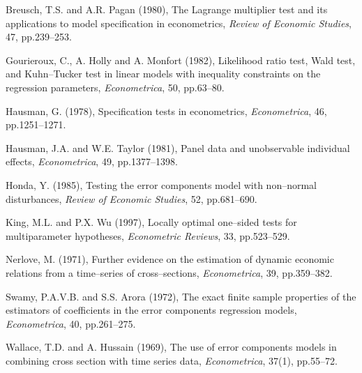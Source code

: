 \documentclass{article}
\begin{document}
  Breusch, T.S. and A.R. Pagan (1980), The Lagrange multiplier test and
  its applications to model specification in econometrics, \emph{Review
    of Economic Studies}, 47, pp.239--253.

  Gourieroux, C., A. Holly and A. Monfort (1982), Likelihood ratio test,
  Wald test, and Kuhn--Tucker test in linear models with inequality
  constraints on the regression parameters, \emph{Econometrica}, 50,
  pp.63--80.

  Hausman, G. (1978), Specification tests in econometrics,
  \emph{Econometrica}, 46, pp.1251--1271.

  Hausman, J.A. and W.E. Taylor (1981), Panel data and unobservable
  individual effects, \emph{Econometrica}, 49, pp.1377--1398.
  
  Honda, Y. (1985), Testing the error components model with non--normal
  disturbances, \emph{Review of Economic Studies}, 52, pp.681--690.

  King, M.L. and P.X. Wu (1997), Locally optimal one--sided tests for
  multiparameter hypotheses, \emph{Econometric Reviews}, 33,
  pp.523--529.

  Nerlove, M. (1971), Further evidence on the estimation of dynamic
  economic relations from a time--series of cross--sections,
  \emph{Econometrica}, 39, pp.359--382.

  Swamy, P.A.V.B. and S.S. Arora (1972), The exact finite sample
  properties of the estimators of coefficients in the error components
  regression models, \emph{Econometrica}, 40, pp.261--275.

  Wallace, T.D. and A. Hussain (1969), The use of error components
  models in combining cross section with time series data,
  \emph{Econometrica}, 37(1), pp.55--72.
\end{document}
